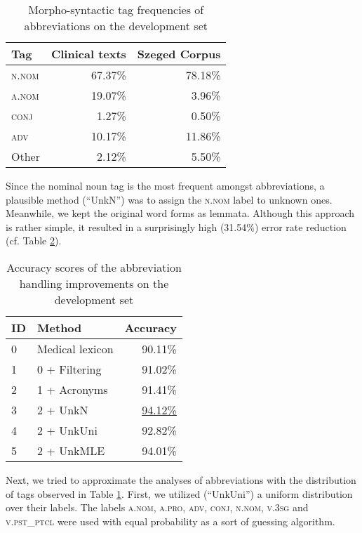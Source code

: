 \begin{table}[H]
\centering
\caption{Morpho-syntactic tag frequencies of abbreviations on the development set}
\label{tab:pos_distribution}
\begin{tabular}{ l r r} 
\hline
Tag & Clinical texts & Szeged Corpus  \\ 
\hline
\scshape{n.nom} & 67.37\% & 78.18\% \\
\scshape{a.nom} & 19.07\% & 3.96\% \\
\scshape{conj} & 1.27\% & 0.50\% \\
\scshape{adv} & 10.17\% & 11.86\% \\
Other & 2.12\% & 5.50\% \\
\hline
\end{tabular}
\end{table}

Since the nominal noun tag is the most frequent amongst abbreviations, a plausible method (``UnkN'') was to assign the \textsc{n.nom} label to unknown ones. 
Meanwhile, we kept the original word forms as lemmata. 
Although this approach is rather simple, it resulted in a surprisingly high (31.54\%) error rate reduction (cf. Table \ref{tab:abbrev_fixes}). 

\begin{table}[H]
\centering
\caption{Accuracy scores of the abbreviation handling improvements on the development set}
\label{tab:abbrev_fixes}
\begin{tabular}{ l l r } 
\hline
ID & Method &  Accuracy \\
\hline
0 & Medical lexicon & 90.11\% \\
1 & 0 + Filtering & 91.02\% \\
2 & 1 + Acronyms & 91.41\% \\
3 & 2 + UnkN & \underline{94.12\%} \\
4 & 2 + UnkUni & 92.82\% \\
5 & 2 + UnkMLE & 94.01\% \\
\hline
\end{tabular}
\end{table}

Next, we tried to approximate the analyses of abbreviations with the distribution of tags observed in Table \ref{tab:pos_distribution}. 
First, we utilized (``UnkUni'') a uniform distribution over their labels. %
The labels \textsc{a.nom}, \textsc{a.pro}, \textsc{adv}, \textsc{conj}, \textsc{n.nom}, \textsc{v.3sg} and \textsc{v.pst\_ptcl} were used with equal probability as a sort of guessing algorithm.

